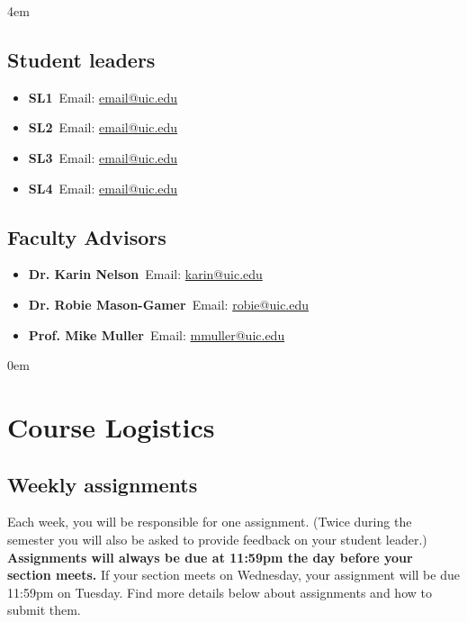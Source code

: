 \documentclass[12pt]{article}
\begin{document}
\leftskip 4em
\begin{multicols}{2}
  

  \subsection{Student leaders}

  \begin{itemize}[label=$\mathwitch*$]
    \item{\textbf{SL1}\ Email: \url{email@uic.edu}}
   \item{\textbf{SL2}\ Email: \url{email@uic.edu}}
  \item{\textbf{SL3}\ Email: \url{email@uic.edu}}
   \item{\textbf{SL4}\ Email: \url{email@uic.edu}}
    \end{itemize}

    \columnbreak

\subsection{Faculty Advisors}
    
    \begin{itemize}[label=$\mathwitch*$]
      \item{\textbf{Dr. Karin Nelson}\ Email: \url{karin@uic.edu}}
      \item{\textbf{Dr. Robie Mason-Gamer}\ Email: \url{robie@uic.edu}}
      \item{\textbf{Prof. Mike Muller}\  Email: \url{mmuller@uic.edu}}
    \end{itemize}

  \end{multicols}   



\leftskip 0em

\section{Course Logistics}

\subsection{Weekly assignments}

Each week, you will be responsible for one assignment. (Twice during the semester you will also be asked to provide feedback on your student leader.) \textbf{Assignments will always be due at 11:59pm the day before your section meets.} If your section meets on Wednesday, your assignment will be due 11:59pm on Tuesday. Find more details below about assignments and how to submit them.
\end{document}
